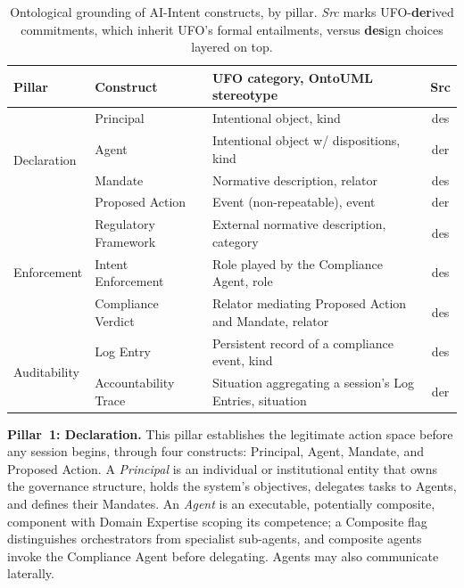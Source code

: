 \documentclass[runningheads]{llncs}
\begin{document}
\begin{table}
\color{blue}
\centering
\caption{Ontological grounding of AI-Intent constructs, by pillar. \emph{Src} marks UFO-\textbf{der}ived commitments, which inherit UFO's formal entailments, versus \textbf{des}ign choices layered on top.}
\label{tab:ufo}
\newcommand{\uml}[1]{\guillemotleft #1\guillemotright}
\begin{tabularx}{\textwidth}{@{}llXc@{}}
\toprule
\textbf{Pillar} & \textbf{Construct} & \textbf{UFO category, OntoUML stereotype} & \textbf{Src}\\
\midrule
\multirow[t]{4}{*}{Declaration}
  & Principal            & Intentional object, \uml{kind}                                & des \\
  & Agent                & Intentional object w/ dispositions, \uml{kind}                & der \\
  & Mandate              & Normative description, \uml{relator} & des \\
  & Proposed Action      & Event (non-repeatable), \uml{event}                           & der \\
\midrule
\multirow[t]{3}{*}{Enforcement}
  & Regulatory Framework & External normative description, \uml{category}                & des \\
  & Intent Enforcement   & Role played by the Compliance Agent, \uml{role}        & des \\
  & Compliance Verdict   & Relator mediating Proposed Action and Mandate, \uml{relator}  & des \\
\midrule
\multirow[t]{2}{*}{Auditability}
  & Log Entry            & Persistent record of a compliance event, \uml{kind}           & des \\
  & Accountability Trace & Situation aggregating a session's Log Entries, \uml{situation}& der \\
\bottomrule
\end{tabularx}
\end{table}

\textbf{Pillar~1: Declaration.}
This pillar establishes the legitimate action space before any session begins, through four constructs: Principal, Agent, Mandate, and Proposed Action. A \textit{Principal} is an individual or institutional entity that owns the governance structure, holds the system's objectives, delegates tasks to Agents, and defines their Mandates. An \textit{Agent} is an executable, potentially composite, component with Domain Expertise scoping its competence; a Composite flag distinguishes orchestrators from specialist sub-agents, and composite agents invoke the Compliance Agent before delegating. Agents may also communicate laterally.
\end{document}
